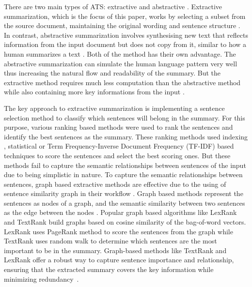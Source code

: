 \documentclass[acmlarge]{acmart}
\begin{document}
There are two main types of ATS: extractive and abstractive \cite{tas-2017-rev-text-sum-2}. Extractive summarization, which is the focus of this paper, works by selecting a subset from the source document, maintaining the original wording and sentence structure \cite{moratanch-2017-extractive-review}. In contrast, abstractive summarization involves synthesising new text that reflects information from the input document but does not copy from it, similar to how a human summarizes a text \cite{Moratanch-2016-abstractive-rev}. Both of the method has their own advantage. The abstractive summarization can simulate the human language pattern very well thus increasing the natural flow and readability of the summary. But the extractive method requires much less computation than the abstractive method while also containing more key informations from the input \cite{gupta-2010-extractive-rev}.

The key approach to extractive summarization is implementing a sentence selection method to classify which sentences will belong in the summary. For this purpose, various ranking based methods were used to rank the sentences and identify the best sentences as the summary. These ranking methods used indexing \cite{Baxendale_1958_firstsummarization}, statistical \cite{edmundson_1969_earlysum} or Term Frequency-Inverse Document Frequency (TF-IDF) \cite{das-2022-tfidf,sarkar-2012-tfidf-2,sarkar-2012-tfidf} based techniques to score the sentences and  select the best scoring ones. But these methods fail to capture the semantic relationships between sentences of the input due to being simplistic in nature. To capture the semantic relationships between sentences, graph based extractive methods are effective due to the using of sentence similarity graph in their workflow \cite{wafaa-2021-summary-comprehensive-review}. Graph based methods represent the sentences as nodes of a graph, and the semantic similarity between two sentences as the edge between the nodes \cite{moratanch-2017-extractive-review}. Popular graph based algorithms like LexRank \cite{Erkan-lexRank-2004} and TextRank \cite{mihalcea-2004-textrank} build graphs based on cosine similarity of the bag-of-word vectors. LexRank uses PageRank \cite{page-PageRank-1999} method to score the sentences from the graph while TextRank uses random walk to determine which sentences are the most important to be in the summary. Graph-based methods like TextRank and LexRank offer a robust way to capture sentence importance and relationship, ensuring that the extracted summary covers the key information while minimizing redundancy~\cite{wafaa-2021-summary-comprehensive-review}.
\end{document}
